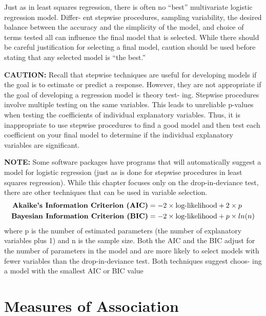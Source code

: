 \documentclass[
]{report}
\begin{document}
Just as in least squares regression, there is often no ``best'' multivariate logistic regression model. Differ-
ent stepwise procedures, sampling variability, the desired balance between the accuracy and the simplicity
of the model, and choice of terms tested all can influence the final model that is selected. While there should
be careful justification for selecting a final model, caution should be used before stating that any selected
model is ``the best.''

\large

\textbf{CAUTION:}
Recall that stepwise techniques are useful for developing models if the goal is to estimate or predict a
response. However, they are not appropriate if the goal of developing a regression model is theory test-
ing. Stepwise procedures involve multiple testing on the same variables. This leads to unreliable p-values
when testing the coefficients of individual explanatory variables. Thus, it is inappropriate to use stepwise
procedures to find a good model and then test each coefficient on your final model to determine if the
individual explanatory variables are significant.
\normalsize 

\large

\textbf{NOTE:}
Some software packages have programs that will automatically suggest a model for logistic regression
(just as is done for stepwise procedures in least squares regression). While this chapter focuses only on
the drop-in-deviance test, there are other techniques that can be used in variable selection.
\begin{align}
\textbf{Akaike’s Information Criterion (AIC)} &= -2 \times \text{log-likelihood} + 2 \times p \notag \\
\textbf{Bayesian Information Criterion (BIC)} &= -2 \times \text{log-likelihood} + p \times ln(n) \notag
\end{align}
where p is the number of estimated parameters (the number of explanatory variables plus 1) and n is the
sample size. Both the AIC and the BIC adjust for the number of parameters in the model and are more
likely to select models with fewer variables than the drop-in-deviance test. Both techniques suggest choos-
ing a model with the smallest AIC or BIC value
\normalsize 

\section{\texorpdfstring{\textbf{Measures of Association}}{Measures of Association}}\label{measures-of-association}
\end{document}
